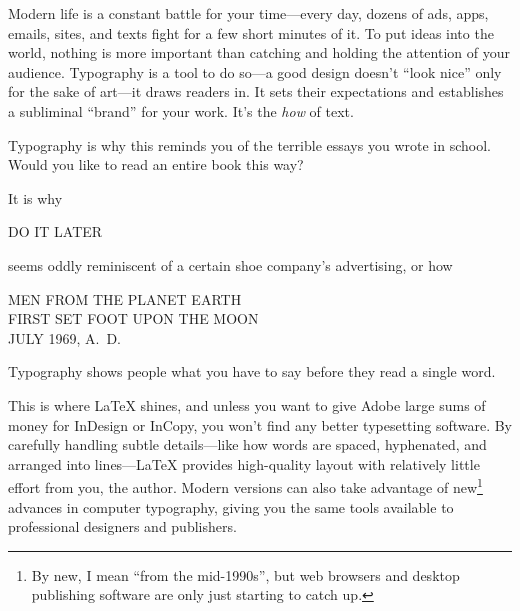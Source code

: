 Modern life is a constant battle for your time---every day,
dozens of ads, apps, emails, sites, and texts fight
for a few short minutes of it.
To put ideas into the world,
nothing is more important than catching and holding
the attention of your audience.
Typography is a tool to do so---a good design doesn't ``look nice''
only for the sake of art---it draws readers in.\punckern{}
It sets their expectations and establishes a subliminal ``brand'' for your
work.\punckern{}
It's the \emph{how} of text.
\begin{leftfigure}
\fontsize{12pt}{24pt}\selectfont\raggedright
Typography is why this reminds you of the terrible essays
you wrote in school.
Would you like to read an entire book this way?
\end{leftfigure}
It is why
\begin{leftfigure}
\noindent{}\Large DO IT LATER
\end{leftfigure}
seems oddly reminiscent of a certain shoe company's advertising,
or how
\begin{center}
\noindent MEN FROM THE PLANET EARTH \\
FIRST SET FOOT UPON THE MOON \\
JULY 1969, A.~D.
\end{center}
Typography shows people
what you have to say before they read a single word.

This is where \LaTeX{} shines, and
unless you want to give Adobe large sums
of money for InDesign or InCopy,
you won't find any better typesetting software.
By carefully handling subtle details---like how words are spaced,
hyphenated, and arranged into lines---\LaTeX{} provides high-quality layout
with relatively little effort from you, the author.
Modern versions can also take advantage of new\footnote{By new,
I mean ``from the mid-1990s''\quotekern, but web browsers and desktop publishing
software are only just starting to catch up.} advances in computer typography,
giving you the same tools available to professional designers and publishers.

